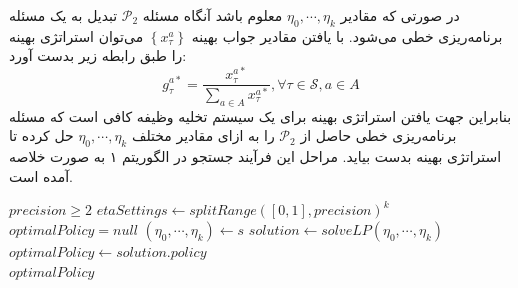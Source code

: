 در صورتی که مقادیر
$\eta_0, \cdots, \eta_k$
معلوم باشد آنگاه مسئله
$\mathcal{P}_2$
تبدیل به یک مسئله برنامه‌ریزی خطی می‌شود. با یافتن مقادیر جواب بهینه
$\left\{x_{\tau}^{a}\right\}$ 
می‌توان استراتژی بهینه را طبق رابطه زیر بدست آورد:
\begin{equation}
	g_{\tau}^{a *}=\frac{x_{\tau}^{a *}}{\sum_{a \in A} x_{\tau}^{a *}}, \forall \tau \in \mathcal{S}, a \in A
\end{equation}
بنابراین جهت یافتن استراتژی بهینه برای یک سیستم تخلیه وظیفه کافی است که مسئله برنامه‌ریزی خطی حاصل از
$\mathcal{P}_2$
را به ازای مقادیر مختلف 
$\eta_0, \cdots, \eta_k$
حل کرده تا استراتژی بهینه بدست بیاید. مراحل این فرآیند جستجو در الگوریتم ۱ به صورت خلاصه آمده است.

\begin{latin}
	\begin{algorithm}
		\label{alg:cap}
		\begin{algorithmic}[1]
			\Require $precision \geq 2$
			\State $etaSettings \gets splitRange([0, 1], precision)^k$
			\State $optimalPolicy = null$
				\State $(\eta_0, \cdots, \eta_k) \gets s$
				\State $solution \gets solveLP(\eta_0, \cdots, \eta_k)$
					\State $optimalPolicy \gets solution.policy$
				\EndIf
			\EndFor \\
			\Return $optimalPolicy$
		\end{algorithmic}
	\end{algorithm}
\end{latin}